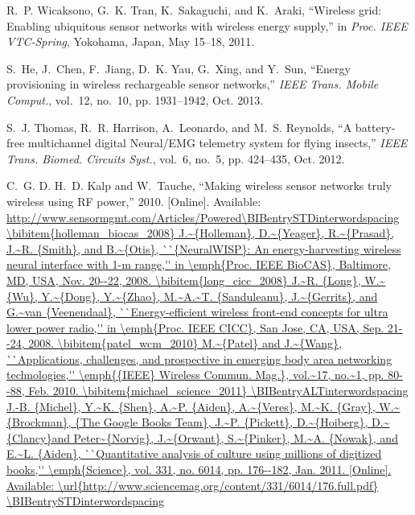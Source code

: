 \documentclass[11pt,draftclsnofoot,journal,onecolumn]{IEEEtran}
\begin{document}
\begin{thebibliography}{10}
R.~P. {Wicaksono}, G.~K. {Tran}, K.~{Sakaguchi}, and K.~{Araki}, ``Wireless
  grid: Enabling ubiquitous sensor networks with wireless energy supply,'' in
  \emph{Proc. IEEE VTC-Spring}, Yokohama, Japan, May 15--18, 2011.

S.~{He}, J.~{Chen}, F.~{Jiang}, D.~K. {Yau}, G.~{Xing}, and Y.~{Sun}, ``Energy
  provisioning in wireless rechargeable sensor networks,'' \emph{{IEEE} Trans.
  Mobile Comput.}, vol.~12, no.~10, pp. 1931--1942, Oct. 2013.

S.~J. {Thomas}, R.~R. {Harrison}, A.~{Leonardo}, and M.~S. {Reynolds}, ``A
  battery-free multichannel digital {Neural/EMG} telemetry system for flying
  insects,'' \emph{{IEEE} Trans. Biomed. Circuits Syst.}, vol.~6, no.~5, pp.
  424--435, Oct. 2012.

\BIBentryALTinterwordspacing
C.~G. D. H.~D. {Kalp} and W.~{Tauche}, ``Making wireless sensor networks truly
  wireless using {RF} power,'' 2010. [Online]. Available:
  \url{http://www.sensormgmt.com/Articles/Powered\BIBentrySTDinterwordspacing

\bibitem{holleman_biocas_2008}
J.~{Holleman}, D.~{Yeager}, R.~{Prasad}, J.~R. {Smith}, and B.~{Otis},
  ``{NeuralWISP}: An energy-harvesting wireless neural interface with 1-m
  range,'' in \emph{Proc. IEEE BioCAS}, Baltimore, MD, USA, Nov. 20--22, 2008.

\bibitem{long_cicc_2008}
J.~R. {Long}, W.~{Wu}, Y.~{Dong}, Y.~{Zhao}, M.~A.~T. {Sanduleanu},
  J.~{Gerrits}, and G.~van {Veenendaal}, ``Energy-efficient wireless front-end
  concepts for ultra lower power radio,'' in \emph{Proc. IEEE CICC}, San Jose,
  CA, USA, Sep. 21--24, 2008.

\bibitem{patel_wcm_2010}
M.~{Patel} and J.~{Wang}, ``Applications, challenges, and prospective in
  emerging body area networking technologies,'' \emph{{IEEE} Wireless Commun.
  Mag.}, vol.~17, no.~1, pp. 80--88, Feb. 2010.

\bibitem{michael_science_2011}
\BIBentryALTinterwordspacing
J.-B. {Michel}, Y.~K. {Shen}, A.~P. {Aiden}, A.~{Veres}, M.~K. {Gray},
  W.~{Brockman}, {The Google Books Team}, J.~P. {Pickett}, D.~{Hoiberg},
  D.~{Clancy}and Peter~{Norvig}, J.~{Orwant}, S.~{Pinker}, M.~A. {Nowak}, and
  E.~L. {Aiden}, ``Quantitative analysis of culture using millions of digitized
  books,'' \emph{Science}, vol. 331, no. 6014, pp. 176--182, Jan. 2011.
  [Online]. Available:
  \url{http://www.sciencemag.org/content/331/6014/176.full.pdf}
\BIBentrySTDinterwordspacing

}
\end{thebibliography}
\end{document}

